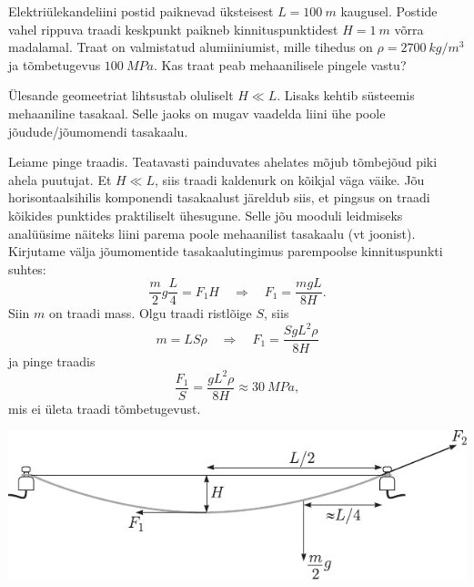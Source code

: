 
Elektriülekandeliini postid paiknevad üksteisest $L = \SI{100}{m}$ kaugusel. Postide vahel rippuva traadi keskpunkt paikneb kinnituspunktidest $H = \SI{1}{m}$ võrra madalamal. Traat on valmistatud alumiiniumist, mille tihedus on $\rho = \SI{2700}{kg/m^3}$ ja tõmbetugevus $\SI{100}{MPa}$. Kas traat peab mehaanilisele pingele vastu?

\hint
Ülesande geomeetriat lihtsustab oluliselt $H \ll L$. Lisaks kehtib süsteemis mehaaniline tasakaal. Selle jaoks on mugav vaadelda liini ühe poole jõudude/jõumomendi tasakaalu.

\solu
Leiame pinge traadis. Teatavasti painduvates ahelates mõjub tõmbejõud piki ahela puutujat. Et $H \ll L$, siis traadi kaldenurk on kõikjal väga väike. Jõu horisontaalsihilis komponendi tasakaalust järeldub siis, et pingsus on traadi kõikides punktides praktiliselt ühesugune. Selle jõu mooduli leidmiseks analüüsime näiteks liini parema poole mehaanilist tasakaalu (vt joonist). Kirjutame välja jõumomentide tasakaalutingimus parempoolse kinnituspunkti suhtes:
$$
\frac{m}{2} g \frac{L}{4}=F_{1} H \quad \Rightarrow \quad F_{1}=\frac{m g L}{8 H} .
$$
Siin $m$ on traadi mass. Olgu traadi ristlõige $S$, siis
$$
m=L S \rho \quad \Rightarrow \quad F_{1}=\frac{S g L^{2} \rho}{8 H}
$$
ja pinge traadis
$$
\frac{F_{1}}{S}=\frac{g L^{2} \rho}{8 H} \approx \SI{30}{MPa},
$$
mis ei ületa traadi tõmbetugevust.
\begin{center}
	\includegraphics[width=\linewidth]{2004-lahg-10-lah.pdf}
\end{center}
\probend